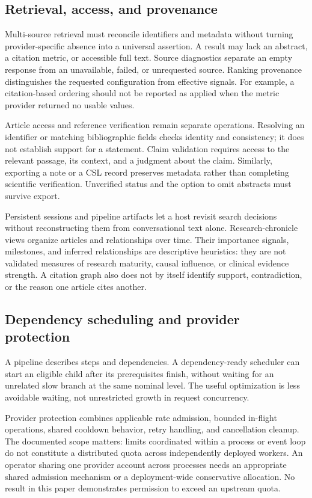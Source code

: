 \documentclass[11pt]{article}
\begin{document}
\subsection{Retrieval, access, and provenance}
Multi-source retrieval must reconcile identifiers and metadata without turning
provider-specific absence into a universal assertion. A result may lack an
abstract, a citation metric, or accessible full text. Source diagnostics separate
an empty response from an unavailable, failed, or unrequested source. Ranking
provenance distinguishes the requested configuration from effective signals.
For example, a citation-based ordering should not be reported as applied when
the metric provider returned no usable values.

Article access and reference verification remain separate operations. Resolving
an identifier or matching bibliographic fields checks identity and consistency;
it does not establish support for a statement. Claim validation requires access
to the relevant passage, its context, and a judgment about the claim. Similarly,
exporting a note or a CSL record preserves metadata rather than completing
scientific verification. Unverified status and the option to omit abstracts must
survive export.

Persistent sessions and pipeline artifacts let a host revisit search decisions
without reconstructing them from conversational text alone. Research-chronicle
views organize articles and relationships over time. Their importance signals,
milestones, and inferred relationships are descriptive heuristics: they are not
validated measures of research maturity, causal influence, or clinical evidence
strength. A citation graph also does not by itself identify support, contradiction,
or the reason one article cites another.

\subsection{Dependency scheduling and provider protection}
A pipeline describes steps and dependencies. A dependency-ready scheduler can
start an eligible child after its prerequisites finish, without waiting for an
unrelated slow branch at the same nominal level. The useful optimization is less
avoidable waiting, not unrestricted growth in request concurrency.

Provider protection combines applicable rate admission, bounded in-flight
operations, shared cooldown behavior, retry handling, and cancellation cleanup.
The documented scope matters: limits coordinated within a process or event loop
do not constitute a distributed quota across independently deployed workers.
An operator sharing one provider account across processes needs an appropriate
shared admission mechanism or a deployment-wide conservative allocation.
No result in this paper demonstrates permission to exceed an upstream quota.
\end{document}
